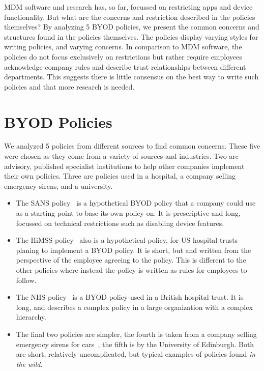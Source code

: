 \documentclass[conference,twocolumn]{IEEEtran}
\begin{document}
MDM software and research has, so far, focussed on restricting apps and device functionality.
But what are the concerns and restriction described in the policies themselves?
By analyzing 5 BYOD policies, we present the common concerns and structures found in the policies themselves.
The policies display varying styles for writing policies, and varying concerns.
In comparison to MDM software, the policies do not focus exclusively on restrictions but rather require employees acknowledge company rules and describe trust relationships between different departments.
This suggests there is little consensus on the best way to write such policies and that more research is needed.

\section{BYOD Policies}
\label{sec:byod_policies}

We analyzed 5 policies from different sources to find common concerns.
These five were chosen as they come from a variety of sources and industries.
Two are advisory, published specialist institutions to help other companies implement their own policies.
Three are policies used in a hospital, a company selling emergency sirens, and a university.
\begin{itemize}
  \item The SANS policy~\cite{nicholas_r._c._guerin_security_2008} is a hypothetical BYOD policy that a company could use as a starting point to base its own policy on.
    It is prescriptive and long, focussed on technical restrictions such as disabling device features.
  \item The HiMSS policy~\cite{healthcare_information_and_management_systems_society_mobile_2012} also is a hypothetical policy, for US hospital trusts planing to implement a BYOD policy.
    It is short, but and written from the perspective of the employee agreeing to the policy.
    This is different to the other policies where instead the policy is written as rules for employees to follow.
  \item The NHS policy~\cite{kennington_mobiles_2014} is a BYOD policy used in a British hospital trust.
    It is long, and describes a complex policy in a large organization with a complex hierarchy.
  \item The final two policies are simpler, the fourth is taken from a company selling emergency sirens for cars~\cite{code3pse.org_sample_????}, the fifth is by the University of Edinburgh.  
Both are short, relatively uncomplicated, but typical examples of policies found \emph{in the wild}.
\end{itemize}
\end{document}
